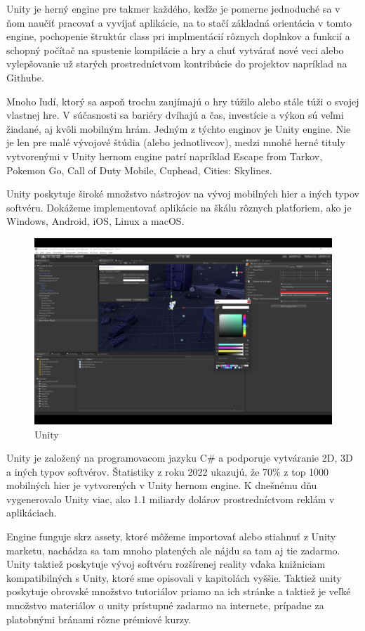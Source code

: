 Unity je herný engine pre takmer každého, keďže je pomerne jednoduché sa v ňom naučiť pracovať a vyvíjať aplikácie, na to stačí základná orientácia v tomto engine, pochopenie štruktúr class pri implmentácií rôznych doplnkov a funkcií a schopný počítač na spustenie kompilácie a hry a chuť vytvárať nové veci alebo vylepšovanie už starých prostredníctvom kontribúcie do projektov napríklad na Githube.

Mnoho ľudí, ktorý sa aspoň trochu zaujímajú o hry túžilo alebo stále túži o svojej vlastnej hre. V súčasnosti sa bariéry dvíhajú a čas, investície a výkon sú veľmi žiadané, aj kvôli mobilným hrám. Jedným z týchto enginov je Unity engine. Nie je len pre malé vývojové štúdia (alebo jednotlivcov), medzi mnohé herné tituly vytvorenými v Unity hernom engine patrí napríklad Escape from Tarkov, Pokemon Go, Call of Duty Mobile, Cuphead, Cities: Skylines.

Unity poskytuje široké množstvo nástrojov na vývoj mobilných hier a iných typov softvéru. Dokážeme implementovať aplikácie na škálu rôznych platforiem, ako je Windows, Android, iOS, Linux a macOS. 

\begin{figure}[h]
\centering
\includegraphics[width=1\textwidth]{img/unityEditor.png}
\caption{Unity \cite{unityscreenshot}}
\label{fig:godotEditor}
\end{figure}

Unity je založený na programovacom jazyku C\# a podporuje vytváranie 2D, 3D a iných typov softvérov. Štatistiky z roku 2022 ukazujú, že 70\% z top 1000 mobilných hier je vytvorených v Unity hernom engine. K dnešnému dňu vygenerovalo Unity viac, ako 1.1 miliardy dolárov prostredníctvom reklám v aplikáciach. 

Engine funguje skrz assety, ktoré môžeme importovať alebo stiahnuť z Unity marketu, nachádza sa tam mnoho platených ale nájdu sa tam aj tie zadarmo. Unity taktiež poskytuje vývoj softvéru rozšírenej reality vďaka knižniciam kompatibilných s Unity, ktoré sme opisovali v kapitolách vyššie. Taktiež unity poskytuje obrovské množstvo tutoriálov priamo na ich stránke a taktiež je veľké množstvo materiálov o unity prístupné zadarmo na internete, prípadne za platobnými bránami rôzne prémiové kurzy.

